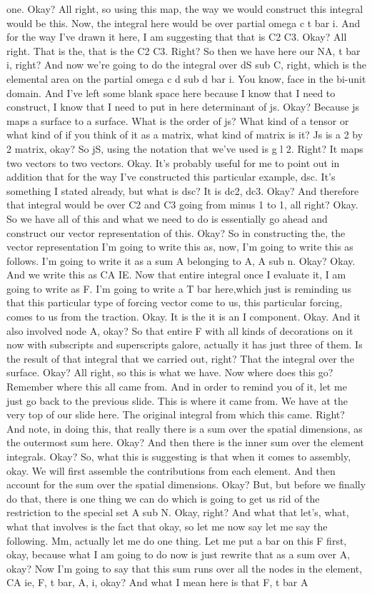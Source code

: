 \documentclass[10pt]{article}
\begin{document}
one. Okay? All right, so using this map, the way we would construct this integral would be this. Now, the integral here would be over partial omega c t bar i. And for the way I've drawn it here, I am suggesting that that is C2 C3. Okay? All right. That is the, that is the C2 C3. Right? So then we have here our NA, t bar i, right? And now we're going to do the integral over dS sub C, right, which is the elemental area on the partial omega c d sub d bar i. You know, face in the bi-unit domain. And I've left some blank space here because I know that I need to construct, I know that I need to put in here determinant of js. Okay? Because js maps a surface to a surface. What is the order of js? What kind of a tensor or what kind of if you think of it as a matrix, what kind of matrix is it? Js is a 2 by 2 matrix, okay? So jS, using the notation that we've used is g l 2. Right? It maps two vectors to two vectors. Okay. It's probably useful for me to point out in addition that for the way I've constructed this particular example, dsc. It's something I stated already, but what is dsc? It is dc2, dc3. Okay? And therefore that integral would be over C2 and C3 going from minus 1 to 1, all right? Okay. So we have all of this and what we need to do is essentially go ahead and construct our vector representation of this. Okay? So in constructing the, the vector representation I'm going to write this as, now, I'm going to write this as follows. I'm going to write it as a sum A belonging to A, A sub n. Okay? Okay. And we write this as CA IE. Now that entire integral once I evaluate it, I am going to write as F. I'm going to write a T bar here,which just is reminding us that this particular type of forcing vector come to us, this particular forcing, comes to us from the traction. Okay. It is the it is an I component. Okay. And it also involved node A, okay? So that entire F with all kinds of decorations on it now with subscripts and superscripts galore, actually it has just three of them. Is the result of that integral that we carried out, right? That the integral over the surface. Okay? All right, so this is what we have. Now where does this go? Remember where this all came from. And in order to remind you of it, let me just go back to the previous slide. This is where it came from. We have at the very top of our slide here. The original integral from which this came. Right? And note, in doing this, that really there is a sum over the spatial dimensions, as the outermost sum here. Okay? And then there is the inner sum over the element integrals. Okay? So, what this is suggesting is that when it comes to assembly, okay. We will first assemble the contributions from each element. And then account for the sum over the spatial dimensions. Okay? But, but before we finally do that, there is one thing we can do which is going to get us rid of the restriction to the special set A sub N. Okay, right? And what that let's, what, what that involves is the fact that okay, so let me now say let me say the following. Mm, actually let me do one thing. Let me put a bar on this F first, okay, because what I am going to do now is just rewrite that as a sum over A, okay? Now I'm going to say that this sum runs over all the nodes in the element, CA ie, F, t bar, A, i, okay? And what I mean here is that F, t bar A 
\end{document}
